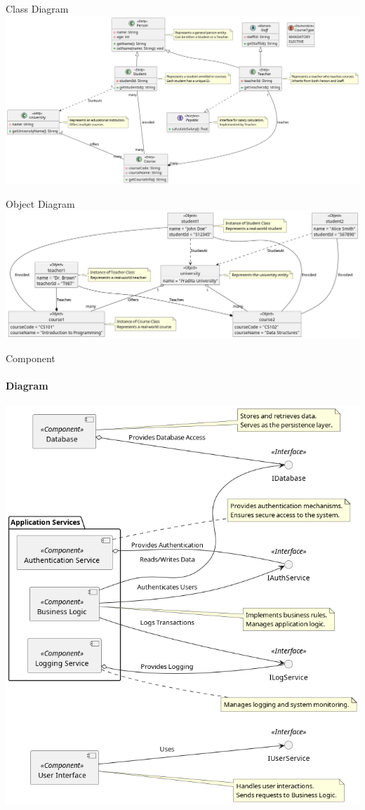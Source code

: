 \documentclass[aspectratio=169, table]{beamer}
\begin{document}
\begin{frame}{Class Diagram}
	\vspace{20pt}
	\centering
	\includegraphics[width=\textwidth]{../../figures/out/class_diagram.png}
\end{frame}

\begin{frame}{Object Diagram}
	\vspace{20pt}
	\centering
	\includegraphics[width=\textwidth]{../../figures/out/object_diagram.png}
\end{frame}

\begin{frame}{Component}
	\framesubtitle{Diagram}
	\centering
	\vspace{-5pt}
	\hspace{10pt}\includegraphics[width=.55\textwidth]{../../figures/out/component_diagram.png}
\end{frame}
\end{document}
